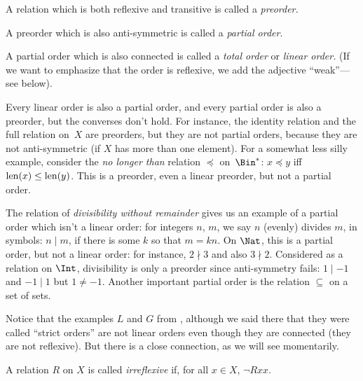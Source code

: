 \documentclass[../../../include/open-logic-section]{subfiles}
\begin{document}

\begin{defn}[Preorder]
A relation which is both reflexive and transitive is called a
\emph{preorder.}  
\end{defn}

\begin{defn}
A preorder which is also anti-symmetric is called a
\emph{partial order}.
\end{defn}

\begin{defn}
 A partial order which is also connected is called a
\emph{total order} or \emph{linear order.} (If we want to emphasize
that the order is reflexive, we add the adjective ``weak''---see
below).
\end{defn}

\begin{ex}
Every linear order is also a partial order, and every partial order is
also a preorder, but the converses don't hold. For instance, the
identity relation and the full relation on~$X$ are preorders, but they
are not partial orders, because they are not anti-symmetric (if $X$
has more than one element). For a somewhat less silly example,
consider the \emph{no longer than} relation $\preccurlyeq$
on~$\Bin^*$: $x \preccurlyeq y$ iff $\mathrm{len}(x) \le \mathrm{len}(y)$. This is a
preorder, even a linear preorder, but not a partial order.

The relation of \emph{divisibility without remainder} gives us an
example of a partial order which isn't a linear order: for integers
$n$, $m$, we say $n$ (evenly) divides $m$, in symbols: $n\mid m$, if
there is some $k$ so that $m=kn$. On $\Nat$, this is a partial order,
but not a linear order: for instance, $2\nmid3$ and also
$3\nmid2$. Considered as a relation on $\Int$, divisibility is only a
preorder since anti-symmetry fails: $1\mid-1$ and $-1\mid1$ but
$1\neq-1$. Another important partial order is the relation $\subseteq$
on a set of sets.

Notice that the examples $L$ and $G$ from ,
although we said there that they were called ``strict orders'' are not
linear orders even though they are connected (they are not
reflexive). But there is a close connection, as we will see
momentarily.
\end{ex}

\begin{defn}[Irreflexivity]
A relation $R$ on $X$ is called \emph{irreflexive} if, for all $x \in
X$, $ \lnot Rxx$. 
\end{defn}
\end{document}
